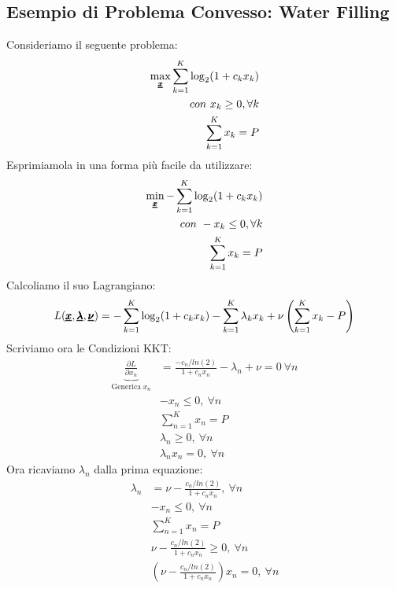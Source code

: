 \subsection{Esempio di Problema Convesso: Water Filling}
Consideriamo il seguente problema:
\begin{equation*}
    \begin{aligned}
    \max_{\pmb{\underline{x}}} \sum_{k=1}^K \log_2 (1 + c_k x_k)\\
    con \ x_k \geq 0, \forall k \\
    \sum_{k=1}^K x_k = P
    \end{aligned}
\end{equation*}
Esprimiamola in una forma più facile da utilizzare:
\begin{equation*}
    \begin{aligned}
    \min_{\pmb{\underline{x}}} - \sum_{k=1}^K \log_2 (1 + c_k x_k)\\
    con \ -x_k \leq 0, \forall k \\
    \sum_{k=1}^K x_k = P
    \end{aligned}
\end{equation*}
Calcoliamo il suo Lagrangiano:
\begin{equation*}
    L(\pmb{\underline{x}}, \pmb{\underline{\lambda}}, \pmb{\underline{\nu}}) =  - \sum_{k=1}^K \log_2 (1 + c_k x_k) - \sum_{k=1}^K \lambda_k x_k + \nu \left(\sum_{k=1}^K x_k - P \right)
\end{equation*}
Scriviamo ora le Condizioni KKT:
\begin{equation*}
    \begin{aligned}
   \underbrace{\frac{\partial L}{\partial x_n}}_{\text{Generica} \ x_n} &= \frac{-c_n/ln(2)}{1 + c_n x_n} - \lambda_n + \nu = 0 \ \forall n \\
    &-x_n \leq 0, \ \forall n \\
    &\sum_{n=1}^K x_n = P \\
    &\lambda_n \geq 0, \ \forall n \\
    &\lambda_n x_n = 0, \ \forall n
    \end{aligned}
\end{equation*}
Ora ricaviamo $\lambda_n$ dalla prima equazione:
\begin{equation*}
    \begin{aligned}
    \lambda_n &= \nu - \frac{c_n / ln(2)}{1 + c_n x_n}, \ \forall n \\
    &-x_n \leq 0, \ \forall n \\
    &\sum_{n=1}^K x_n = P \\
    &\nu - \frac{c_n / ln(2)}{1 + c_n x_n} \geq 0, \ \forall n \\
    &\left(\nu - \frac{c_n / ln(2)}{1 + c_n x_n}\right) x_n = 0, \ \forall n
    \end{aligned}
\end{equation*}
